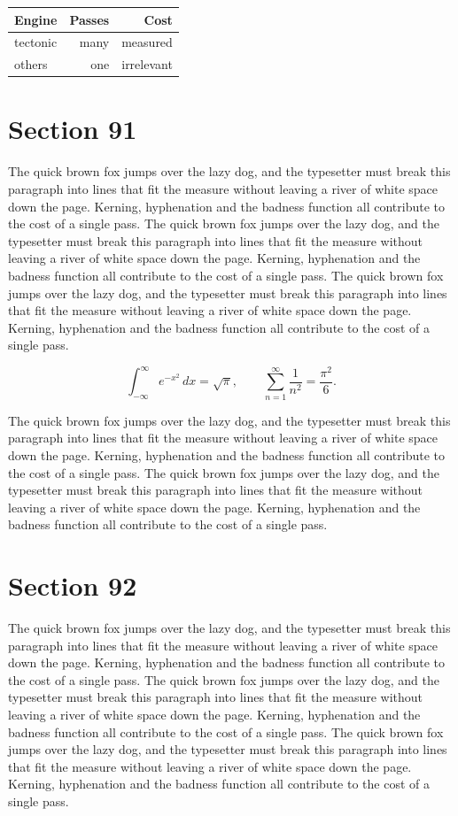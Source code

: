 \documentclass{article}
\begin{document}
\begin{center}
\begin{tabular}{lrr}
\toprule
Engine & Passes & Cost \\
\midrule
tectonic & many & measured \\
others & one & irrelevant \\
\bottomrule
\end{tabular}
\end{center}

\section{Section 91}
The quick brown fox jumps over the lazy dog, and the typesetter must break this paragraph into lines that fit the measure without leaving a river of white space down the page. Kerning, hyphenation and the badness function all contribute to the cost of a single pass. The quick brown fox jumps over the lazy dog, and the typesetter must break this paragraph into lines that fit the measure without leaving a river of white space down the page. Kerning, hyphenation and the badness function all contribute to the cost of a single pass. The quick brown fox jumps over the lazy dog, and the typesetter must break this paragraph into lines that fit the measure without leaving a river of white space down the page. Kerning, hyphenation and the badness function all contribute to the cost of a single pass. 

\begin{equation}
\int_{-\infty}^{\infty} e^{-x^{2}}\,dx = \sqrt{\pi}, \qquad
\sum_{n=1}^{\infty} \frac{1}{n^{2}} = \frac{\pi^{2}}{6}.
\end{equation}

The quick brown fox jumps over the lazy dog, and the typesetter must break this paragraph into lines that fit the measure without leaving a river of white space down the page. Kerning, hyphenation and the badness function all contribute to the cost of a single pass. The quick brown fox jumps over the lazy dog, and the typesetter must break this paragraph into lines that fit the measure without leaving a river of white space down the page. Kerning, hyphenation and the badness function all contribute to the cost of a single pass. 
\section{Section 92}
The quick brown fox jumps over the lazy dog, and the typesetter must break this paragraph into lines that fit the measure without leaving a river of white space down the page. Kerning, hyphenation and the badness function all contribute to the cost of a single pass. The quick brown fox jumps over the lazy dog, and the typesetter must break this paragraph into lines that fit the measure without leaving a river of white space down the page. Kerning, hyphenation and the badness function all contribute to the cost of a single pass. The quick brown fox jumps over the lazy dog, and the typesetter must break this paragraph into lines that fit the measure without leaving a river of white space down the page. Kerning, hyphenation and the badness function all contribute to the cost of a single pass. 
\end{document}
